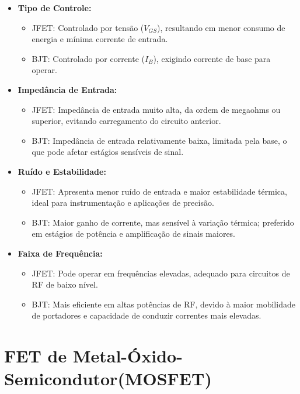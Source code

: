 \documentclass[12pt]{article}
\begin{document}
\begin{itemize}
    \item \textbf{Tipo de Controle:}
    \begin{itemize}
        \item JFET: Controlado por tensão (\(V_{GS}\)), resultando em menor consumo de energia e mínima corrente de entrada.
        \item BJT: Controlado por corrente (\(I_B\)), exigindo corrente de base para operar.
    \end{itemize}

    \item \textbf{Impedância de Entrada:}
    \begin{itemize}
        \item JFET: Impedância de entrada muito alta, da ordem de megaohms ou superior, evitando carregamento do circuito anterior.
        \item BJT: Impedância de entrada relativamente baixa, limitada pela base, o que pode afetar estágios sensíveis de sinal.
    \end{itemize}

    \item \textbf{Ruído e Estabilidade:}
    \begin{itemize}
        \item JFET: Apresenta menor ruído de entrada e maior estabilidade térmica, ideal para instrumentação e aplicações de precisão.
        \item BJT: Maior ganho de corrente, mas sensível à variação térmica; preferido em estágios de potência e amplificação de sinais maiores.
    \end{itemize}

    \item \textbf{Faixa de Frequência:}
    \begin{itemize}
        \item JFET: Pode operar em frequências elevadas, adequado para circuitos de RF de baixo nível.
        \item BJT: Mais eficiente em altas potências de RF, devido à maior mobilidade de portadores e capacidade de conduzir correntes mais elevadas.
    \end{itemize}
\end{itemize}


\section{FET de Metal-Óxido-Semicondutor(MOSFET)}
\end{document}
